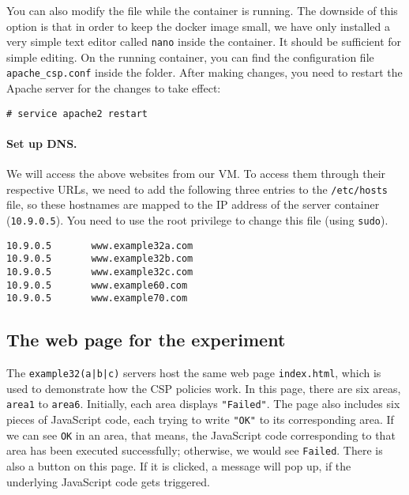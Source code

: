 You can also modify the file while the container is running. 
The downside of this 
option is that in order to keep the docker image small, 
we have only installed a very simple text editor called \texttt{nano} 
inside the container. It should be sufficient for simple editing.   
On the running container, you can find the configuration
file \texttt{apache\_csp.conf} inside the 
 folder.  
After making changes, you need to restart the Apache server for the 
changes to take effect:

\begin{lstlisting}
# service apache2 restart
\end{lstlisting}


\paragraph{Set up DNS.}
We will access the above websites from our VM. 
To access them through their respective URLs, 
we need to add the following three entries to the 
\texttt{/etc/hosts} file, so these hostnames are mapped to 
the IP address of the server container (\texttt{10.9.0.5}). 
You need to use the root privilege to 
change this file (using \texttt{sudo}).

\begin{lstlisting}
10.9.0.5       www.example32a.com
10.9.0.5       www.example32b.com
10.9.0.5       www.example32c.com
10.9.0.5       www.example60.com
10.9.0.5       www.example70.com
\end{lstlisting}


\subsection{The web page for the experiment}

The \texttt{example32(a|b|c)} servers host 
the same web page \texttt{index.html}, which 
is used to demonstrate how the CSP policies work. 
In this page, there are six areas, \texttt{area1} to \texttt{area6}.
Initially, each area displays \texttt{"Failed"}. The page
also includes six pieces of JavaScript code, each trying to
write \texttt{"OK"} to its corresponding area.  If we can see
\texttt{OK} in an area, that means, the JavaScript code corresponding
to that area has been executed successfully; otherwise, we would see
\texttt{Failed}. There is also a button on this page. 
If it is clicked, a message will pop up, if the underlying 
JavaScript code gets triggered. 



